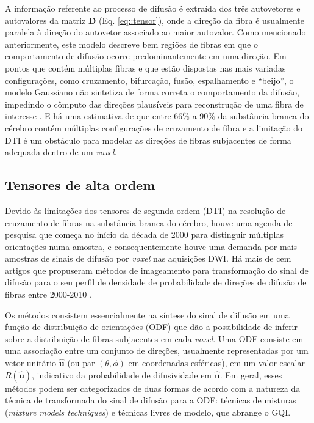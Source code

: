 \documentclass[
    12pt,                %
    oneside,            %
    a4paper,            %
    english,            %
    french,                %
    spanish,            %
    brazil                %
    ]{abntex2}
\begin{document}
A informação referente ao processo de difusão é extraída dos três autovetores e autovalores da matriz $\mathbf{D}$ (Eq. \ref{eq::tensor}), onde a direção da fibra é usualmente paralela à direção do autovetor associado ao maior autovalor.
Como mencionado anteriormente, este modelo descreve bem regiões de fibras em que o comportamento de difusão ocorre predominantemente em uma direção. Em pontos que contém múltiplas fibras e que estão dispostas nas mais variadas configurações, como cruzamento, bifurcação, fusão, espalhamento e ``beijo'', o modelo Gaussiano não sintetiza de forma correta o comportamento da difusão, impedindo o cômputo das direções plausíveis para reconstrução de uma fibra de interesse \cite{fillard2011, daducci2014}. E há uma estimativa de que entre 66\% a 90\% da substância branca do cérebro contém múltiplas configurações de cruzamento de fibra \cite{descoteaux2015} e a limitação do DTI é um obstáculo para modelar as direções de fibras subjacentes de forma adequada dentro de um \textit{voxel}.

\subsection{Tensores de alta ordem}
\label{metodos_de_alta_ordem}

Devido às limitações dos tensores de segunda ordem (DTI) na resolução de cruzamento de fibras na substância branca do cérebro, houve uma agenda de pesquisa que começa no início da década de 2000 para distinguir múltiplas orientações numa amostra, e consequentemente houve uma demanda por mais amostras de sinais de difusão por \textit{voxel} nas aquisições DWI. %
Há mais de cem artigos que propuseram métodos de imageamento para transformação do sinal de difusão para o seu perfil de densidade de probabilidade de direções de difusão de fibras entre 2000-2010 \cite{descoteaux2015}.

Os métodos consistem essencialmente na síntese do sinal de difusão em uma função de distribuição de orientações (ODF) que dão a possibilidade de inferir sobre a distribuição de fibras subjacentes em cada \textit{voxel}. Uma ODF consiste em uma associação entre um conjunto de direções, usualmente representadas por um vetor unitário $\mathbf{\hat{u}}$ (ou par $(\theta, \phi)$ em coordenadas esféricas), em um valor escalar $R(\mathbf{\hat{u}})$, indicativo da probabilidade de difusividade em $\mathbf{\hat{u}}$. Em geral, esses métodos podem ser categorizados de duas formas de acordo com a natureza da técnica de transformada do sinal de difusão para a ODF: técnicas de misturas (\textit{mixture models techniques}) e técnicas livres de modelo, que abrange o GQI.
\end{document}

